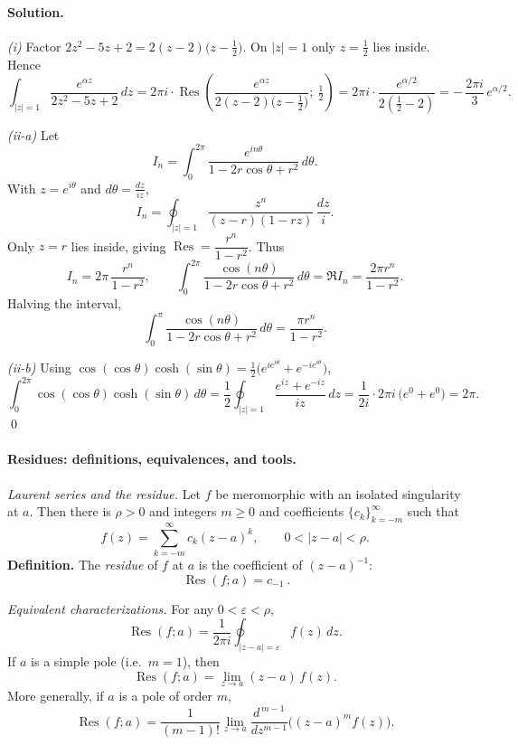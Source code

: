 \documentclass[11pt,a4paper]{article}
\theoremstyle{definition}
\theoremstyle{definition}
\theoremstyle{plain}
\theoremstyle{remark}
\DeclareMathOperator{\Res}{Res}
\begin{document}
\paragraph{Solution.}
\emph{(i)} Factor $2z^{2}-5z+2=2(z-2)\bigl(z-\tfrac12\bigr)$. On $|z|=1$ only $z=\tfrac12$ lies inside.
Hence
\[
\int_{|z|=1}\frac{e^{\alpha z}}{2z^{2}-5z+2}\,dz
=2\pi i\cdot \Res\!\left(\frac{e^{\alpha z}}{2(z-2)\bigl(z-\tfrac12\bigr)};\ \tfrac12\right)
=2\pi i\cdot \frac{e^{\alpha/2}}{2(\tfrac12-2)}
=-\,\frac{2\pi i}{3}\,e^{\alpha/2}.
\]

\medskip
\emph{(ii-a)} Let
\[
I_n=\int_{0}^{2\pi}\frac{e^{in\theta}}{1-2r\cos\theta+r^{2}}\,d\theta.
\]
With $z=e^{i\theta}$ and $d\theta=\frac{dz}{iz}$,
\[
I_n=\oint_{|z|=1}\frac{z^{n}}{(z-r)(1-rz)}\,\frac{dz}{i}.
\]
Only $z=r$ lies inside, giving $\Res=\dfrac{r^{n}}{1-r^{2}}$. Thus
\[
I_n=2\pi\,\frac{r^{n}}{1-r^{2}},\qquad
\int_{0}^{2\pi}\frac{\cos(n\theta)}{1-2r\cos\theta+r^{2}}\,d\theta
=\Re I_n=\frac{2\pi r^{n}}{1-r^{2}}.
\]
Halving the interval,
\[
\int_{0}^{\pi}\frac{\cos(n\theta)}{1-2r\cos\theta+r^{2}}\,d\theta
=\frac{\pi r^{n}}{1-r^{2}}.
\]

\medskip
\emph{(ii-b)} Using
$\cos(\cos\theta)\cosh(\sin\theta)=\tfrac12\big(e^{i e^{i\theta}}+e^{-i e^{i\theta}}\big)$,
\[
\int_{0}^{2\pi}\cos(\cos\theta)\cosh(\sin\theta)\,d\theta
=\frac12\oint_{|z|=1}\frac{e^{iz}+e^{-iz}}{iz}\,dz
=\frac{1}{2i}\cdot 2\pi i\,\bigl(e^{0}+e^{0}\bigr)=2\pi.
\]
\qed



\paragraph{Residues: definitions, equivalences, and tools.}

\medskip
\emph{Laurent series and the residue.}
Let $f$ be meromorphic with an isolated singularity at $a$.
Then there is $\rho>0$ and integers $m\ge 0$ and coefficients $\{c_k\}_{k=-m}^{\infty}$ such that
\[
f(z)=\sum_{k=-m}^{\infty} c_k (z-a)^k, \qquad 0<|z-a|<\rho .
\]
\textbf{Definition.} The \emph{residue} of $f$ at $a$ is the coefficient of $(z-a)^{-1}$:
\[
\boxed{\ \Res(f;a)=c_{-1}\ }.
\]

\medskip
\emph{Equivalent characterizations.}
For any $0<\varepsilon<\rho$,
\[
\Res(f;a)=\frac{1}{2\pi i}\oint_{|z-a|=\varepsilon} f(z)\,dz.
\]
If $a$ is a simple pole (i.e.\ $m=1$), then
\[
\Res(f;a)=\lim_{z\to a} (z-a)\,f(z).
\]
More generally, if $a$ is a pole of order $m$,
\[
\Res(f;a)=\frac{1}{(m-1)!}\lim_{z\to a}\frac{d^{\,m-1}}{dz^{m-1}}\big((z-a)^m f(z)\big).
\]
\end{document}
